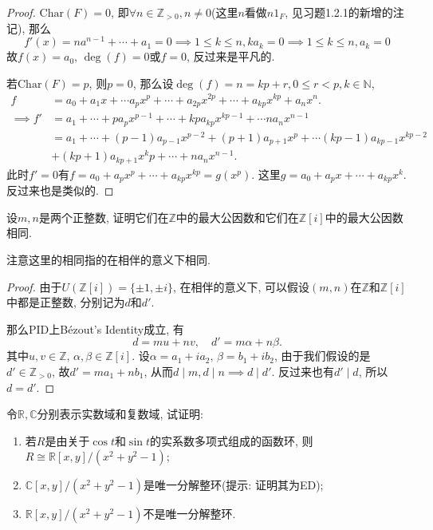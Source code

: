 \documentclass{../solutions-cn}
\begin{document}
\begin{proof}
    $\mathrm{Char}(F) = 0$, 即$\forall n \in \mathbb{Z}_{>0}, n \neq 0$(这里$n$看做$n1_F$, 见习题1.2.1的新增的注记), 那么
    \[
        f'(x) = na^{n - 1} + \cdots + a_1 = 0 \implies 1 \leqslant k \leqslant n, ka_k = 0 \implies 1 \leqslant k \leqslant n, a_k = 0
    \]
    故$f(x) = a_0$, $\deg(f) = 0$或$f = 0$, 反过来是平凡的.

    若$\mathrm{Char}(F) = p$, 则$p = 0$, 那么设$\deg(f) = n = kp + r, 0 \leqslant r < p, k \in \mathbb{N}$,
    \[
    \begin{aligned}
        f &= a_0 + a_1x + \cdots a_px^p + \cdots + a_{2p}x^{2p} + \cdots + a_{kp}x^{kp} + a_nx^n.\\
        \implies f' &= a_1 + \cdots + pa_px^{p - 1} + \cdots + kpa_{kp}x^{kp - 1} + \cdots na_nx^{n - 1}\\
        &= a_1 + \cdots + (p - 1)a_{p - 1}x^{p - 2} + (p + 1)a_{p + 1}x^p + \cdots (kp - 1)a_{kp - 1}x^{kp - 2}\\
        &+ (kp + 1)a_{kp + 1}x^kp + \cdots + na_nx^{n - 1}.
    \end{aligned}
    \]
    此时$f' = 0$有$f = a_0 + a_px^p + \cdots + a_{kp}x^{kp} = g(x^p)$. 这里$g = a_0 + a_px + \cdots + a_{kp}x^k$. 反过来也是类似的.
\end{proof}

\begin{exercise}[习题2.2.1]
    设$m, n$是两个正整数, 证明它们在$\mathbb{Z}$中的最大公因数和它们在$\mathbb{Z}[i]$中的最大公因数相同.
\end{exercise}

注意这里的相同指的在相伴的意义下相同.

\begin{proof}
    由于$U(\mathbb{Z}[i]) = \{\pm 1, \pm i\}$, 在相伴的意义下, 可以假设$(m, n)$在$\mathbb{Z}$和$\mathbb{Z}[i]$中都是正整数, 分别记为$d$和$d'$.

    那么PID上Bézout's Identity成立, 有
    \[
        d = mu + nv,\quad d' = m\alpha + n\beta.
    \]
    其中$u, v \in \mathbb{Z},\, \alpha, \beta \in \mathbb{Z}[i]$. 设$\alpha = a_1 + ia_2,\, \beta = b_1 + ib_2$, 由于我们假设的是$d' \in \mathbb{Z}_{>0}$, 故$d' = ma_1 + nb_1$, 从而$d \mid m, d \mid n \implies d \mid d'$. 反过来也有$d' \mid d$, 所以$d = d'$.
\end{proof}

\begin{exercise}[习题2.2.6]
    令$\mathbb{R}, \mathbb{C}$分别表示实数域和复数域, 试证明: 
    \begin{enumerate}[(1)]
        \item 若$R$是由关于$\cos t$和$\sin t$的实系数多项式组成的函数环, 则$R \cong \mathbb{R}[x, y]/(x^2 + y^2 - 1)$;
        \item $\mathbb{C}[x, y]/(x^2 + y^2 - 1)$是唯一分解整环(提示: 证明其为ED);
        \item $\mathbb{R}[x, y]/(x^2 + y^2 - 1)$不是唯一分解整环.
    \end{enumerate}
\end{exercise}
\end{document}
